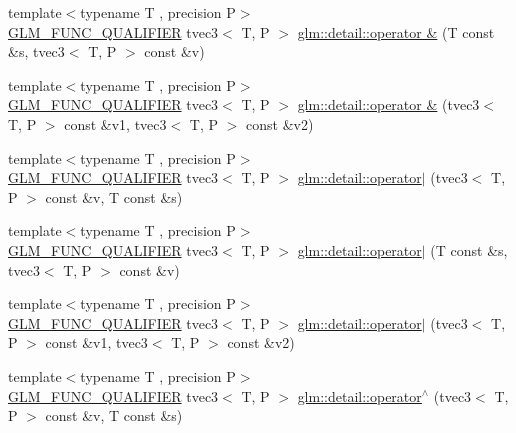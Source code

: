 \begin{DoxyCompactItemize}
\item 
{\footnotesize template$<$typename T , precision P$>$ }\\\hyperlink{setup_8hpp_a33fdea6f91c5f834105f7415e2a64407}{G\+L\+M\+\_\+\+F\+U\+N\+C\+\_\+\+Q\+U\+A\+L\+I\+F\+I\+ER} tvec3$<$ T, P $>$ \hyperlink{namespaceglm_1_1detail_aefbb704ad6365f24001b0c050f08c20f}{glm\+::detail\+::operator \&} (T const \&s, tvec3$<$ T, P $>$ const \&v)
\item 
{\footnotesize template$<$typename T , precision P$>$ }\\\hyperlink{setup_8hpp_a33fdea6f91c5f834105f7415e2a64407}{G\+L\+M\+\_\+\+F\+U\+N\+C\+\_\+\+Q\+U\+A\+L\+I\+F\+I\+ER} tvec3$<$ T, P $>$ \hyperlink{namespaceglm_1_1detail_a07dd2d5d6577eae9e391f75f22bd6c70}{glm\+::detail\+::operator \&} (tvec3$<$ T, P $>$ const \&v1, tvec3$<$ T, P $>$ const \&v2)
\item 
{\footnotesize template$<$typename T , precision P$>$ }\\\hyperlink{setup_8hpp_a33fdea6f91c5f834105f7415e2a64407}{G\+L\+M\+\_\+\+F\+U\+N\+C\+\_\+\+Q\+U\+A\+L\+I\+F\+I\+ER} tvec3$<$ T, P $>$ \hyperlink{namespaceglm_1_1detail_a5f11de9a02db320a4922b4b61b7fc850}{glm\+::detail\+::operator$\vert$} (tvec3$<$ T, P $>$ const \&v, T const \&s)
\item 
{\footnotesize template$<$typename T , precision P$>$ }\\\hyperlink{setup_8hpp_a33fdea6f91c5f834105f7415e2a64407}{G\+L\+M\+\_\+\+F\+U\+N\+C\+\_\+\+Q\+U\+A\+L\+I\+F\+I\+ER} tvec3$<$ T, P $>$ \hyperlink{namespaceglm_1_1detail_a397f9f54cc3e9e8c22840ec543b9ef60}{glm\+::detail\+::operator$\vert$} (T const \&s, tvec3$<$ T, P $>$ const \&v)
\item 
{\footnotesize template$<$typename T , precision P$>$ }\\\hyperlink{setup_8hpp_a33fdea6f91c5f834105f7415e2a64407}{G\+L\+M\+\_\+\+F\+U\+N\+C\+\_\+\+Q\+U\+A\+L\+I\+F\+I\+ER} tvec3$<$ T, P $>$ \hyperlink{namespaceglm_1_1detail_a943872c9028a1e4f0520fa36da3f9f2f}{glm\+::detail\+::operator$\vert$} (tvec3$<$ T, P $>$ const \&v1, tvec3$<$ T, P $>$ const \&v2)
\item 
{\footnotesize template$<$typename T , precision P$>$ }\\\hyperlink{setup_8hpp_a33fdea6f91c5f834105f7415e2a64407}{G\+L\+M\+\_\+\+F\+U\+N\+C\+\_\+\+Q\+U\+A\+L\+I\+F\+I\+ER} tvec3$<$ T, P $>$ \hyperlink{namespaceglm_1_1detail_a8191c1c938bb6cfef72591093e726fa2}{glm\+::detail\+::operator$^\wedge$} (tvec3$<$ T, P $>$ const \&v, T const \&s)
\item 

\end{DoxyCompactItemize}
